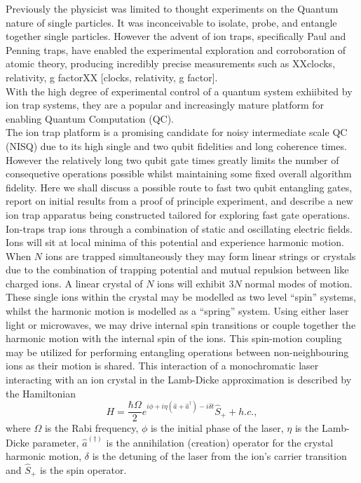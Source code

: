 \documentclass[12pt]{iopart}
\begin{document}
Previously the physicist was limited to thought experiments on the
Quantum nature of single particles. It was inconceivable to isolate,
probe, and entangle together single particles. However the advent of
ion traps, specifically Paul and Penning traps, have enabled the
experimental exploration and corroboration of atomic theory, producing
incredibly precise measurements such as XXclocks, relativity, g
factorXX [clocks, relativity, g factor].\\ With the high degree of
experimental control of a quantum system exhiibited by ion trap
systems, they are a popular and increasingly mature platform for
enabling Quantum Computation (QC).\\
The ion trap platform is a promising candidate for noisy intermediate
scale QC (NISQ) due to its high single and two qubit
fidelities and long coherence times. However the relatively long two
qubit gate times greatly limits the number of consequetive operations
possible whilst maintaining some fixed overall algorithm
fidelity. Here we shall discuss a possible route to fast two qubit
entangling gates, report on initial results from a proof of principle
experiment, and describe a new ion trap apparatus being constructed
tailored for exploring fast gate operations.\\

Ion-traps trap ions through a combination of static and oscillating
electric fields. Ions will sit at local minima of this potential and
experience harmonic motion. When $N$ ions are trapped simultaneously
they may form linear strings or crystals due to the combination of
trapping potential and mutual repulsion between like charged ions. A
linear crystal of $N$ ions will exhibit $3N$ normal modes of
motion. These single ions within the crystal may be modelled as two
level ``spin'' systems, whilst the harmonic motion is modelled as a
``spring'' system. Using either laser light or microwaves, we may
drive internal spin transitions or couple together the harmonic motion
with the internal spin of the ions.  This spin-motion coupling may be
utilized for performing entangling operations between non-neighbouring
ions as their motion is shared. This interaction of a monochromatic
laser interacting with an ion crystal in the Lamb-Dicke approximation
is described by the Hamiltonian
$$H = \frac{\hbar \Omega}{2} e^{i\phi + i\eta(\hat{a} + \hat{a}^\dag) - i\delta t}\hat{S}_+ + h.c.,$$
where $\Omega$ is the Rabi frequency, $\phi$ is the initial phase of
the laser, $\eta$ is the Lamb-Dicke parameter, $\hat{a}^{(\dag)}$ is
the annihilation (creation) operator for the crystal harmonic motion,
$\delta$ is the detuning of the laser from the ion's carrier
transition and $\hat{S}_+$ is the spin operator.\\
\end{document}
